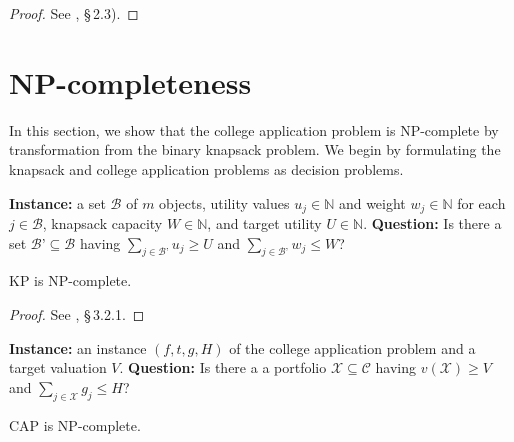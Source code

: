 \begin{proof}
See \cite{kapur2022}, \S\,2.3). 
\end{proof}








\section{NP-completeness} \label{sectionNPC}

In this section, we show that the college application problem is NP-complete by transformation from the binary knapsack problem. We begin by formulating the knapsack and college application problems as decision problems. 

\begin{definition}
\textbf{Instance:} a set $\mathcal{B}$ of $m$ objects, utility values $u_j \in \mathbb{N}$ and weight $w_j \in \mathbb{N}$ for each $j \in \mathcal{B}$, knapsack capacity $W\in \mathbb{N}$, and target utility $U\in \mathbb{N}$. \textbf{Question:} Is there a set $\mathcal{B’} \subseteq \mathcal{B}$ having $\sum_{j \in \mathcal{B’}} u_j \geq U$ and  $\sum_{j \in \mathcal{B’}} w_j \leq W$?
\end{definition}

\begin{theorem} 
KP is NP-complete. 
\end{theorem}

\begin{proof}
See \cite{gareyjohnson1979}, \S\,3.2.1.
\end{proof}

\begin{definition} \label{ellisdecisionform}
\textbf{Instance:} an instance $(f, t, g, H)$ of the college application problem and a target valuation $V$. \textbf{Question:} Is there a a portfolio $\mathcal{X} \subseteq \mathcal{C}$ having $v(\mathcal{X}) \geq V$ and  $\sum_{j \in \mathcal{X}} g_j \leq H$?
\end{definition}

\begin{theorem}
CAP is NP-complete.
\end{theorem}

